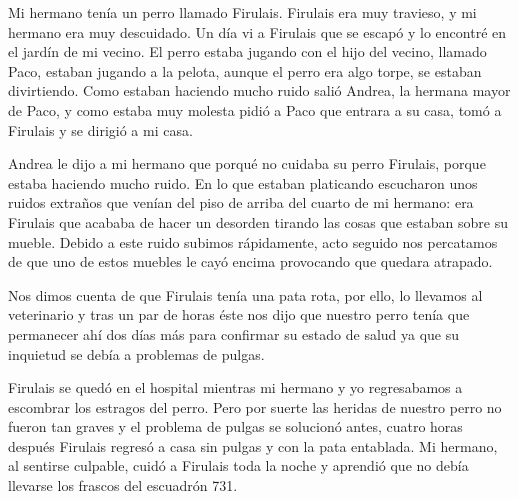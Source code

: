 \documentclass{article}
\begin{document}
Mi hermano tenía un perro llamado Firulais. Firulais era muy travieso, y mi hermano era muy descuidado. Un día vi a Firulais que se escapó y lo encontré en el jardín de mi vecino.
El perro estaba jugando con el hijo del vecino, llamado Paco, estaban jugando a la pelota, aunque el perro era algo torpe, se estaban divirtiendo. Como estaban haciendo mucho ruido salió Andrea, la hermana mayor de Paco, y como estaba muy molesta pidió a Paco que entrara a su casa, tomó a Firulais y se dirigió a mi casa.

Andrea le dijo a mi hermano que porqué no cuidaba su perro Firulais, porque estaba haciendo mucho ruido. En lo que estaban platicando escucharon unos ruidos extraños que venían del piso de arriba del cuarto de mi hermano: era Firulais que acababa de hacer un desorden tirando las cosas que estaban sobre su mueble. Debido a este ruido subimos rápidamente, acto seguido nos percatamos de que uno de estos muebles le cayó encima provocando que quedara atrapado.

Nos dimos cuenta de que Firulais tenía una pata rota, por ello, lo
llevamos al veterinario y tras un par de horas éste nos dijo que
nuestro perro tenía que permanecer ahí dos días más para confirmar su
estado de salud ya que su inquietud se debía a problemas de
pulgas.

Firulais se quedó en el hospital mientras mi hermano y yo regresabamos a escombrar los estragos del perro.
 Pero por suerte las heridas de nuestro perro no fueron tan graves y el problema de pulgas se solucionó antes, cuatro horas después Firulais regresó a casa sin pulgas y con la pata
entablada. Mi hermano, al sentirse culpable, cuidó a Firulais toda la noche
y  aprendió que no debía llevarse los frascos del escuadrón 731.  
\end{document}
